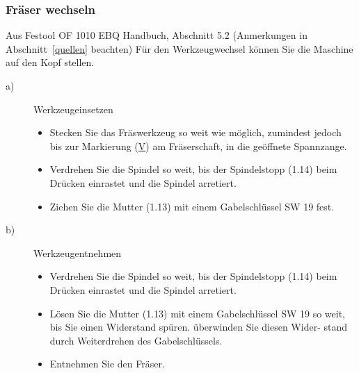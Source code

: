 \documentclass{\basedir/fablab-document}
\begin{document}
\subsubsection{Fräser wechseln}
\begin{leftbar}{Aus Festool OF 1010 EBQ Handbuch, Abschnitt 5.2 (Anmerkungen in Abschnitt~\ref{quellen} beachten)}
Für den Werkzeugwechsel können Sie die Maschine auf den Kopf stellen.
\begin{description}
    \item[a)] Werkzeugeinsetzen
        \begin{itemize}
            \item Stecken Sie das Fräswerkzeug so weit wie möglich, zumindest jedoch bis zur Markierung (\underline{V}) am Fräserschaft, in die geöffnete Spannzange.
            \item Verdrehen Sie die Spindel so weit, bis der Spindelstopp (1.14) beim Drücken einrastet und die Spindel arretiert.
            \item Ziehen Sie die Mutter (1.13) mit einem Gabelschlüssel SW 19 fest.
        \end{itemize}
    \item[b)] Werkzeugentnehmen
        \begin{itemize}
            \item Verdrehen Sie die Spindel so weit, bis der Spindelstopp (1.14) beim Drücken einrastet und die Spindel arretiert.
            \item Lösen Sie die Mutter (1.13) mit einem Gabelschlüssel SW 19 so weit, bis Sie einen Widerstand spüren. überwinden Sie diesen Wider- stand durch Weiterdrehen des Gabelschlüssels.
            \item Entnehmen Sie den Fräser.
        \end{itemize}
\end{description}
\end{leftbar}
\end{document}
